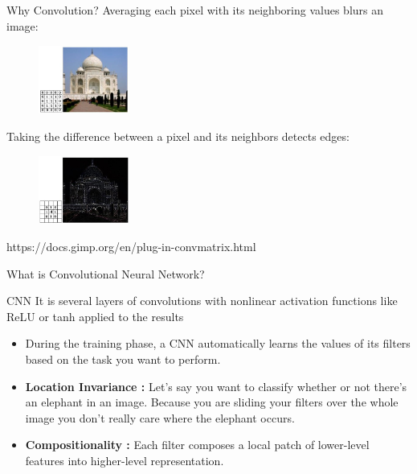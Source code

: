 \documentclass{beamer}
\begin{document}
\begin{frame}{Why Convolution?}
Averaging each pixel with its neighboring values blurs an image:
\begin{figure}
\includegraphics[width=3cm, height=2.25cm]{blur.jpg}
\end{figure}
Taking the difference between a pixel and its neighbors detects edges:
\begin{figure}
\includegraphics[width=3cm, height=2.25cm]{edges.jpg}
\end{figure}

\hspace{3cm}\tiny{https://docs.gimp.org/en/plug-in-convmatrix.html}
    
\end{frame}

\begin{frame}[t]{What is Convolutional Neural Network?}
\begin{block}{CNN}
It is several layers of convolutions with nonlinear activation functions like ReLU or tanh applied to the results
\end{block}
\begin{itemize}
    \item During the training phase, a CNN automatically learns the values of its filters based on the task you want to perform.
    \item \textbf{Location Invariance :} Let’s say you want to classify whether or not there’s an elephant in an image. Because you are sliding your filters over the whole image you don’t really care where the elephant occurs.
    
    \item \textbf{Compositionality :} Each filter composes a local patch of lower-level features into higher-level representation. 
\end{itemize}
    
\end{frame}
\end{document}
